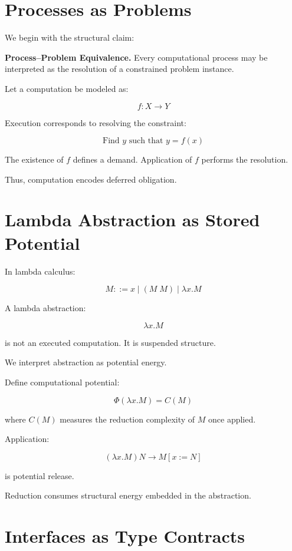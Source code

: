 \documentclass[11pt,openany]{book}
\begin{document}
\section{Processes as Problems}

We begin with the structural claim:

\medskip

\textbf{Process--Problem Equivalence.}
Every computational process may be interpreted as the resolution of a constrained problem instance.

\medskip

Let a computation be modeled as:

\[
f : X \to Y
\]

Execution corresponds to resolving the constraint:

\[
\text{Find } y \text{ such that } y = f(x)
\]

The existence of $f$ defines a demand.
Application of $f$ performs the resolution.

Thus, computation encodes deferred obligation.

\section{Lambda Abstraction as Stored Potential}

In lambda calculus:

\[
M ::= x \mid (M \; M) \mid \lambda x . M
\]

A lambda abstraction:

\[
\lambda x . M
\]

is not an executed computation.
It is suspended structure.

We interpret abstraction as potential energy.

Define computational potential:

\[
\Phi(\lambda x . M) = C(M)
\]

where $C(M)$ measures the reduction complexity of $M$ once applied.

Application:

\[
(\lambda x . M) N \to M[x := N]
\]

is potential release.

Reduction consumes structural energy embedded in the abstraction.

\section{Interfaces as Type Contracts}
\end{document}
